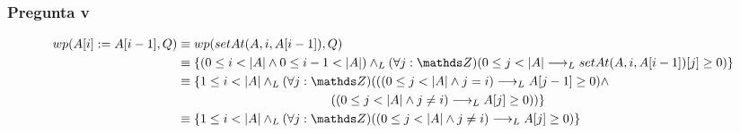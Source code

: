 \subsubsection*{Pregunta v}
\begin{align*}
    wp(A[i] := A[i-1],Q) &\equiv wp(setAt(A, i, A[i-1]),Q) \\
    &\equiv \{ (0 \leq i < |A| \wedge 0 \leq i-1 < |A|) \yLuego (\forall j: \ent)(0 \leq j < |A| \implicaLuego setAt(A, i, A[i-1])[j] \geq 0) \} \\
    &\equiv \{ 1 \leq i < |A| \yLuego (\forall j: \ent)(((0 \leq j < |A| \wedge j = i) \implicaLuego A[j-1] \geq 0) \wedge \\ 
    &\qquad \qquad \qquad \qquad \qquad \qquad \: ((0 \leq j < |A| \wedge j \neq i) \implicaLuego A[j] \geq 0)) \} \\
    &\equiv \{ 1 \leq i < |A| \yLuego (\forall j: \ent)((0 \leq j < |A| \wedge j \neq i) \implicaLuego A[j] \geq 0) \}
\end{align*}

